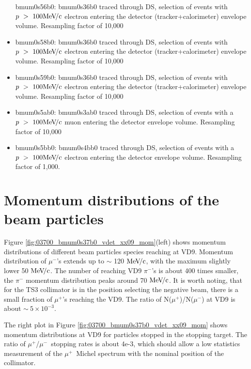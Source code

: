 \documentclass[12pt]{article}
\newcommand {\MeVc}       {\mbox{$\rm MeV\!/c$}}
\newcommand {\muminus}    {\mbox{$\mu^-$}}
\newcommand {\muplus}    {\mbox{$\mu^+$}}
\begin{document}
\begin{itemize}
  bmum0s56b0: bmum0s36b0 traced through DS, selection of events with $p ~>~ 100 \MeVc$ electron entering
  the detector (tracker+calorimeter) envelope volume. Resampling factor of 10,000
\item
  bmum0s58b0: bmum0s36b0 traced through DS, selection of events with $p ~>~ 100 \MeVc$ electron entering
  the detector (tracker+calorimeter) envelope volume. Resampling factor of 10,000
\item
  bmum0s59b0: bmum0s36b0 traced through DS, selection of events with $p ~>~ 100 \MeVc$ electron entering
  the detector (tracker+calorimeter) envelope volume. Resampling factor of 10,000
\item
  bmum0s5ab0: bmum0s3ab0 traced through DS, selection of events with a $p ~>~ 100 \MeVc$ muon
  entering the detector envelope volume. Resampling factor of 10,000
\item
  bmum0s5bb0: bmum0s4bb0 traced through DS, selection of events with a $p ~>~ 100 \MeVc$ electron
  entering the detector envelope volume. Resampling factor of 1,000.
\end{itemize}

\section {Momentum distributions of the beam particles }

Figure \ref{fig:03700_bmum0s37b0_vdet_xx09_mom}(left) shows momentum distributions
of different beam particles species reaching at VD9. Momentum distribution of \muminus's
extends up to $\sim$ 120 \MeVc, with the maximum slightly lower 50 \MeVc.
The number of reaching VD9 $\pi^-$'s is about 400 times smaller, the $\pi^-$ momentum
distribution peaks around 70 \MeVc.
%
It is worth noting, that for the TS3 collimator is in the position selecting the negative beam,
there is a small fraction of \muplus's reaching the VD9.
The ratio of N(\muplus)/N(\muminus) at VD9 is about $\sim ~ 5 \times 10^{-3}$.

The right plot in Figure \ref{fig:03700_bmum0s37b0_vdet_xx09_mom} shows momentum distributions
at VD9 for particles stopped in the stopping target. The ratio of \muplus/\muminus\ stopping rates
is about 4e-3, which should allow a low statistics measurement of the \muplus\ Michel spectrum with
the nominal position of the collimator.
\end{document}
